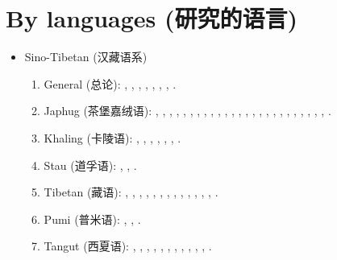 \documentclass[oneside,a4paper,11pt]{article}
\newcommand{\zh}[1]{{\cn #1}}
\newcommand{\lingua}[3]{#1 (\zh{#3})}
\begin{document}
\section{\lingua{By languages}{Publications classées par langue étudiée}{研究的语言}}
\begin{itemize}
\item \lingua{Sino-Tibetan}{Sino-tibétain}{汉藏语系}
\begin{enumerate}
\item \lingua{General}{Général}{总论}: \cite{jacques03s.houzhui}, \cite{jacques06morpho}, \cite{jacques07chang}, \cite{antonov12kumush}, \cite{jacques12agreement},    \cite{michaud-jacques12nasalite}, \cite{jacques16th}, \cite{jacques17rgy}.     
\item \lingua{Japhug}{Japhug}{茶堡嘉绒语}:  \cite{jacques04redupl},     \cite{jacques04these},   \cite{jacques07passif},  \cite{jacques07redupl}, \cite{jacques08},  \cite{jacques10gesar}, \cite{jacques10refl},  \cite{jacques10inverse},  \cite{jacques12incorp},   \cite{jacques12demotion},  \cite{jacques13harmonization},  \cite{jacques13tropative}, \cite{jacques14antipassive}, \cite{japhug14ideophones}, \cite{jacques14inverse}, \cite{jacques14linking}, \cite{jacques16comparative}, \cite{jacques15causative}, \cite{jacques15japhug}, \cite{jacques16relatives}, \cite{jacques16complementation}, \cite{jacques17sketch}, \cite{jacques17num}, \cite{jacques17generic}, \cite{jacques17comitative}, \cite{jacques17ipa}.
\item \lingua{Khaling}{Khaling}{卡陵语}: \cite{jacques12khaling},  \cite{jacques13derivational.khaling}, \cite{jacques14auditory}, \cite{jacques15derivational.khaling}, \cite{jacques15khaling},  \cite{jacques16si}, \cite{jacques16tonogenesis}.
\item \lingua{Stau}{Stau}{道孚语}: \cite{antonov14rtau}, \cite{jacques14rtau}, \cite{jacques17stau}.
\item \lingua{Tibetan}{Tibétain}{藏语}:  \cite{jacques01dg}, \cite{jacques04thimphu}, \cite{jacques07naksatram},      \cite{jacques08debther},  \cite{jacques09wazur}, \cite{jacques09e},  \cite{jacques10zos},   \cite{jacques10ndr},  \cite{jacques11lingua},  \cite{jacques12internal},  \cite{jacques12transcription}, \cite{jacques13yod}, \cite{jacques14snom}, \cite{jacques14cone}.
\item \lingua{Pumi}{Pumi}{普米语}:  \cite{michaud10bonin}, \cite{jacques11pumi.tone}, \cite{jacques11lingua}.
\item \lingua{Tangut}{Tangoute}{西夏语}: \cite{jacques06comparaison},  \cite{jacques07textes}, \cite{jacques08weiyu}, \cite{jacques08alternations},   \cite{jacques09tangutverb},  \cite{jacques10imperial},  \cite{jacques11tangut.verb}, \cite{jacques11ngwemi}, \cite{jacques11kinship},  \cite{jacques14esquisse}, \cite{jacques14ergative}, \cite{jacques16th}.

\end{enumerate}
\end{itemize}
\end{document}
